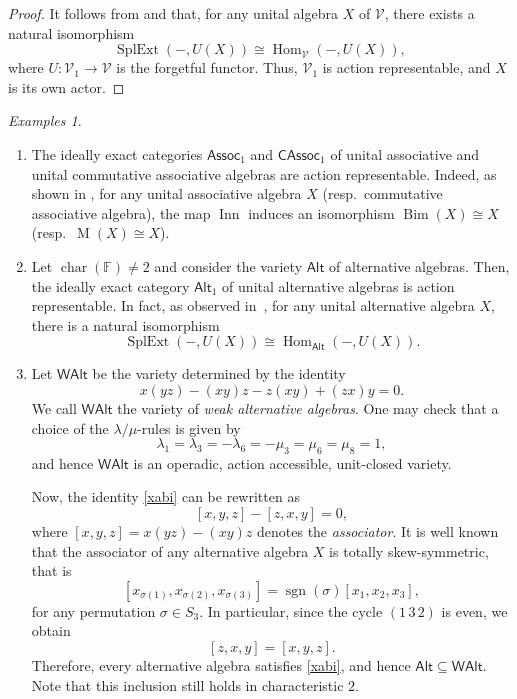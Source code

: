 \documentclass[reqno,a4paper]{amsart}
\theoremstyle{plain}
\theoremstyle{definition}
\theoremstyle{remark}
\newtheorem{examples}[subsection]{Examples}
\numberwithin{equation}{section}
\newcommand{\F}{\mathbb{F}}
\newcommand{\V}{\mathcal{V}}
\DeclareMathOperator{\bchar}{char}
\DeclareMathOperator{\Hom}{Hom}
\DeclareMathOperator{\Bim}{Bim}
\DeclareMathOperator{\SplExt}{SplExt}
\DeclareMathOperator{\Inn}{Inn}
\DeclareMathOperator{\M}{M}
\newcommand{\Assoc}{\ensuremath{\mathsf{Assoc}}}
\newcommand{\CAssoc}{\ensuremath{\mathsf{CAssoc}}}
\newcommand{\Alt}{\ensuremath{\mathsf{Alt}}}
\newcommand{\WAlt}{\ensuremath{\mathsf{WAlt}}}
\begin{document}
\begin{proof}
It follows from  and  that, for any unital algebra $X$ of $\V$, there exists a natural isomorphism
\[
\SplExt(-,U(X)) \cong \Hom_\V(-,U(X)),
\]
where $U \colon \V_1 \rightarrow \V$ is the forgetful functor. Thus, $\V_1$ is action representable, and $X$ is its own actor.
\end{proof}

\begin{examples}{\ }
\begin{enumerate}
\item The ideally exact categories $\Assoc_1$ and $\CAssoc_1$ of unital associative and unital commutative associative algebras are action representable. Indeed, as shown in , for any unital associative algebra $X$ (resp.~commutative associative algebra), the map $\Inn$ induces an isomorphism $\Bim(X) \cong X$ (resp.~$\M(X) \cong X$).

\item
Let $\bchar(\F) \neq 2$ and consider the variety $\Alt$ of alternative algebras. Then, the ideally exact category $\Alt_1$ of unital alternative algebras is action representable. In fact, as observed in~\cite[Example 3.11(8)]{WRAAlg}, for any unital alternative algebra $X$, there is a natural isomorphism
\[
\SplExt(-,U(X)) \cong \Hom_\Alt(-,U(X)).
\]

\item Let $\WAlt$ be the variety determined by the identity
\begin{equation}\label{xabi}
x(yz)-(xy)z - z(xy) + (zx)y = 0.
\end{equation}
We call $\WAlt$ the variety of \emph{weak alternative algebras}. One may check that a choice of the $\lambda/\mu$-rules is given by
\[
\lambda_1=\lambda_3=-\lambda_6=-\mu_3=\mu_6=\mu_8=1,
\]
and hence $\WAlt$ is an operadic, action accessible, unit-closed variety.

Now, the identity \eqref{xabi} can be rewritten as
\[
[x,y,z]-[z,x,y]=0,
\]
where $[x,y,z]=x(yz)-(xy)z$ denotes the \emph{associator}. It is well known that the associator of any alternative algebra $X$ is totally skew-symmetric, that is
\[
[x_{\sigma(1)},x_{\sigma(2)},x_{\sigma(3)}]=\operatorname{sgn}(\sigma)[x_1,x_2,x_3],
\]
for any permutation $\sigma \in S_3$. In particular, since the cycle $(1\,3\,2)$ is even, we obtain
\[
[z,x,y]=[x,y,z].
\]
Therefore, every alternative algebra satisfies \eqref{xabi}, and hence $\Alt \subseteq \WAlt$. Note that this inclusion still holds in characteristic $2$.


\end{enumerate}
\end{examples}
\end{document}

